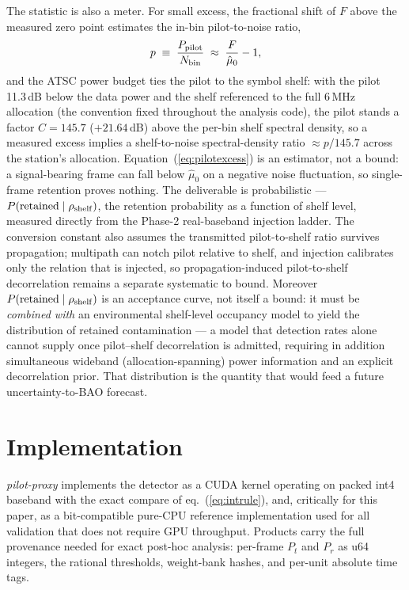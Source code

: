 The statistic is also a meter. For small excess, the fractional shift of
$F$ above the measured zero point estimates the in-bin pilot-to-noise
ratio,
\begin{equation}
  p \;\equiv\; \frac{P_{\rm pilot}}{N_{\rm bin}} \;\approx\;
  \frac{F}{\hat\mu_0} - 1,
  \label{eq:pilotexcess}
\end{equation}
and the ATSC power budget ties the pilot to the symbol shelf: with the
pilot 11.3\,dB below the data power and the shelf referenced to the full
6\,MHz allocation (the convention fixed throughout the analysis code),
the pilot stands a factor $C = 145.7$ ($+21.64$\,dB) above the per-bin
shelf spectral density, so a measured excess implies a shelf-to-noise
spectral-density ratio $\approx p/145.7$ across the station's
allocation. Equation~(\ref{eq:pilotexcess}) is an estimator, not a bound: a
signal-bearing frame can fall below $\hat\mu_0$ on a negative noise
fluctuation, so single-frame retention proves nothing. The deliverable is
probabilistic --- $P(\mathrm{retained} \mid \rho_{\rm shelf})$, the
retention probability as a function of shelf level, measured directly
from the Phase-2 real-baseband injection ladder. The conversion
constant also assumes the transmitted pilot-to-shelf ratio survives
propagation; multipath can notch pilot relative to shelf, and injection
calibrates only the relation that is injected, so propagation-induced
pilot-to-shelf decorrelation remains a separate systematic to bound.
Moreover $P(\mathrm{retained} \mid \rho_{\rm shelf})$ is an acceptance
curve, not itself a bound: it must be \emph{combined with} an
environmental shelf-level occupancy model to yield the distribution of
retained contamination --- a model that detection rates alone cannot
supply once pilot--shelf decorrelation is admitted, requiring in addition
simultaneous wideband (allocation-spanning) power information and an
explicit decorrelation prior. That distribution is the quantity that
would feed a future uncertainty-to-BAO forecast.

\FloatBarrier  %
\section{Implementation}
\label{sec:implementation}

\textit{pilot-proxy} implements the detector as a CUDA kernel operating on
packed int4 baseband with the exact compare of eq.~(\ref{eq:intrule}), and,
critically for this paper, as a bit-compatible pure-CPU reference
implementation used for all validation that does not require GPU
throughput. Products carry the full provenance needed for exact post-hoc
analysis: per-frame $P_t$ and $P_r$ as u64 integers, the rational
thresholds, weight-bank hashes, and per-unit absolute time tags.

